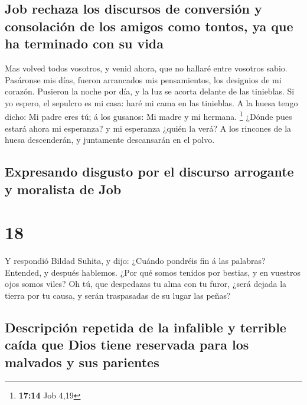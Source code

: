 \hypertarget{job-rechaza-los-discursos-de-conversiuxf3n-y-consolaciuxf3n-de-los-amigos-como-tontos-ya-que-ha-terminado-con-su-vida}{%
\subsection{Job rechaza los discursos de conversión y consolación de los
amigos como tontos, ya que ha terminado con su
vida}\label{job-rechaza-los-discursos-de-conversiuxf3n-y-consolaciuxf3n-de-los-amigos-como-tontos-ya-que-ha-terminado-con-su-vida}}

 Mas volved todos vosotros, y venid ahora, que no hallaré
entre vosotros sabio.  Pasáronse mis días, fueron
arrancados mis pensamientos, los designios de mi corazón. 
Pusieron la noche por día, y la luz se acorta delante de las tinieblas.
 Si yo espero, el sepulcro es mi casa: haré mi cama en las
tinieblas.  A la huesa tengo dicho: Mi padre eres tú; á los
gusanos: Mi madre y mi hermana. \footnote{\textbf{17:14} Job 4,19}
 ¿Dónde pues estará ahora mi esperanza? y mi esperanza
¿quién la verá?  A los rincones de la huesa descenderán, y
juntamente descansarán en el polvo.

\hypertarget{expresando-disgusto-por-el-discurso-arrogante-y-moralista-de-job}{%
\subsection{Expresando disgusto por el discurso arrogante y moralista de
Job}\label{expresando-disgusto-por-el-discurso-arrogante-y-moralista-de-job}}

\hypertarget{section-17}{%
\section{18}\label{section-17}}

 Y respondió Bildad Suhita, y dijo:  ¿Cuándo
pondréis fin á las palabras? Entended, y después hablemos. 
¿Por qué somos tenidos por bestias, y en vuestros ojos somos viles?
 Oh tú, que despedazas tu alma con tu furor, ¿será dejada la
tierra por tu causa, y serán traspasadas de su lugar las peñas?

\hypertarget{descripciuxf3n-repetida-de-la-infalible-y-terrible-cauxedda-que-dios-tiene-reservada-para-los-malvados-y-sus-parientes}{%
\subsection{Descripción repetida de la infalible y terrible caída que
Dios tiene reservada para los malvados y sus
parientes}\label{descripciuxf3n-repetida-de-la-infalible-y-terrible-cauxedda-que-dios-tiene-reservada-para-los-malvados-y-sus-parientes}}

